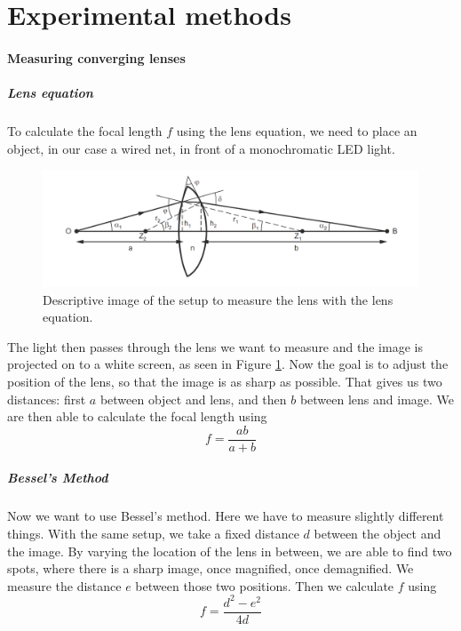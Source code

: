 \section{Experimental methods}

\paragraph{Measuring converging lenses}
\subparagraph{Lens equation}
\label{chap::lens}

To calculate the focal length $f$ using the lens equation, we need to place an object, in our case a wired net, in front of a monochromatic LED light. 

\begin{figure}[ht]
	\centering
	\includegraphics[width=\textwidth]{img/lenseq.PNG}
	\caption{Descriptive image\cite{manual} of the setup to measure the lens with the lens equation.}
	\label{fig::lens}
\end{figure}
The light then passes through the lens we want to measure and the image is projected on to a white screen, as seen in Figure \ref{fig::lens}.
Now the goal is to adjust the position of the lens, so that the image is as sharp as possible.
That gives us two distances:
first $a$ between object and lens, and then $b$ between lens and image.
We are then able to calculate the focal length using
\begin{equation}
	\displaystyle f = \frac{ab}{a+b}
	\label{eq::lens}
\end{equation}





\subparagraph{Bessel's Method}
\label{chap::bessel}
Now we want to use Bessel's method.
Here we have to measure slightly different things.
With the same setup, we take a fixed distance $d$ between the object and the image. 
By varying the location of the lens in between, we are able to find two spots, where there is a sharp image, once magnified, once demagnified.
We measure the distance $e$ between those two positions.
Then we calculate $f$ using
\begin{equation}
	f = \frac{d^2 - e^2}{4d}
	\label{eq::bessel}
\end{equation}


